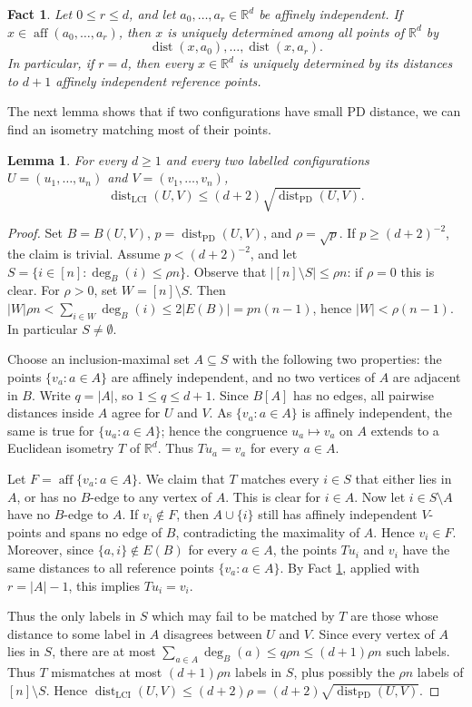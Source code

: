\documentclass[fullpage,11pt]{article}
\newcommand{\R}{\mathbb{R}}
\newcommand{\LCI}{\mathrm{LCI}}
\newcommand{\PD}{\mathrm{PD}}
\providecommand{\dist}{\operatorname{dist}}
\providecommand{\aff}{\operatorname{aff}}
\theoremstyle{break}
\newtheorem{lemma}[theorem]{Lemma}
\newtheorem{fact}[theorem]{Fact}
\theoremstyle{definition}
\theoremstyle{break}
\begin{document}
\begin{fact}\label{fact:reference-points-d}
Let $0\le r\le d$, and let $a_0,\ldots,a_r\in\R^d$ be affinely independent.
If $x\in \aff(a_0,\ldots,a_r)$, then $x$ is uniquely determined among all
points of $\R^d$ by
\[
        \dist(x,a_0),\ldots,\dist(x,a_r).
\]
In particular, if $r=d$, then every $x\in\R^d$ is uniquely determined by its
distances to $d+1$ affinely independent reference points.
\end{fact}

The next lemma shows that if two configurations have small PD distance, we can find an isometry matching most of their points.

\begin{lemma}
\label{lem:dense-agreement-d}
For every $d\ge1$ and every two labelled configurations
\(U=(u_1,\ldots,u_n)\) and \(V=(v_1,\ldots,v_n)\),
\[
        \dist_{\LCI}(U,V)
        \le (d+2)\sqrt{\dist_{\PD}(U,V)} .
\]
\end{lemma}

\begin{proof}
Set $B=B(U,V)$, $p=\dist_{\PD}(U,V)$, and $\rho=\sqrt p$. If
$p\ge (d+2)^{-2}$, the claim is trivial. Assume $p<(d+2)^{-2}$, and let
\(S=\{i\in[n]:\deg_B(i)\le \rho n\}\). Observe that
\(|[n]\setminus S|\le \rho n\): if \(\rho=0\) this is clear. For
\(\rho>0\), set \(W=[n]\setminus S\). Then
\(|W|\rho n<\sum_{i\in W}\deg_B(i)\le2|E(B)|=pn(n-1)\), hence
\(|W|<\rho(n-1)\). In particular \(S\neq\emptyset\).

Choose an inclusion-maximal set $A\subseteq S$ with the following two
properties: the points $\{v_a:a\in A\}$ are affinely independent, and no two
vertices of $A$ are adjacent in $B$. Write $q=|A|$, so \(1\le q\le d+1\). Since $B[A]$
has no edges, all pairwise distances inside $A$ agree for $U$ and $V$. As
$\{v_a:a\in A\}$ is affinely independent, the same is true for
$\{u_a:a\in A\}$; hence the congruence \(u_a\mapsto v_a\) on \(A\) extends
to a Euclidean isometry \(T\) of \(\R^d\). Thus \(T u_a=v_a\) for every
\(a\in A\).

Let \(F=\aff\{v_a:a\in A\}\).
We claim that \(T\) matches every \(i\in S\) that either lies in \(A\), or
has no \(B\)-edge to any vertex of \(A\). This is clear for \(i\in A\). Now
let \(i\in S\setminus A\) have no \(B\)-edge to \(A\). If \(v_i\notin F\),
then \(A\cup\{i\}\) still has
affinely independent \(V\)-points and spans no edge of $B$, contradicting
the maximality of $A$. Hence $v_i\in F$. Moreover, since $\{a,i\}\notin E(B)$
for every $a\in A$, the points $T u_i$ and $v_i$ have the same distances
to all reference points $\{v_a:a\in A\}$. By
Fact \ref{fact:reference-points-d}, applied with \(r=|A|-1\), this implies
\(T u_i=v_i\).

Thus the only labels in \(S\) which may fail to be matched by \(T\) are those
whose distance to some label in \(A\) disagrees between \(U\) and \(V\). Since
every vertex of \(A\) lies in \(S\), there are at most
\(\sum_{a\in A}\deg_B(a)\le q\rho n\le(d+1)\rho n\) such labels. Thus \(T\)
mismatches at most \((d+1)\rho n\) labels in \(S\), plus possibly the
\(\rho n\) labels of \([n]\setminus S\). Hence
\(\dist_{\LCI}(U,V)\le(d+2)\rho=(d+2)\sqrt{\dist_{\PD}(U,V)}\).
\end{proof}
\end{document}
